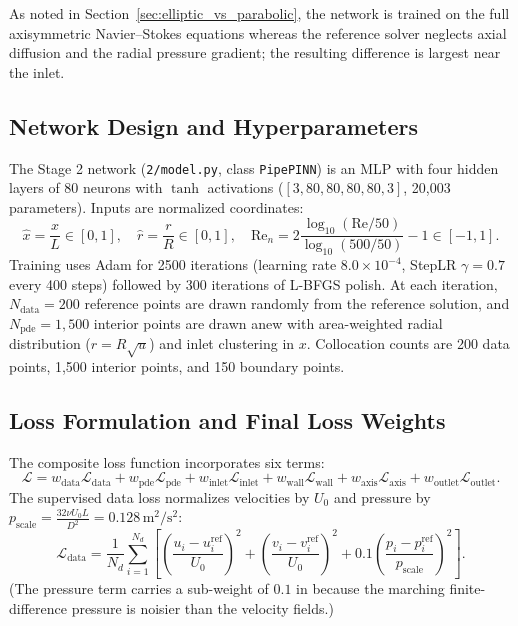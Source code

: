 \documentclass[11pt,a4paper]{article}
\begin{document}
As noted in Section~\ref{sec:elliptic_vs_parabolic}, the network is trained on the full axisymmetric Navier--Stokes equations whereas the reference solver neglects axial diffusion and the radial pressure gradient; the resulting difference is largest near the inlet.

\subsection{Network Design and Hyperparameters}
The Stage 2 network (\texttt{2/model.py}, class \texttt{PipePINN}) is an MLP with four hidden layers of 80 neurons with $\tanh$ activations ($[3, 80, 80, 80, 80, 3]$, 20,003 parameters). Inputs are normalized coordinates:
\begin{equation}
\hat{x} = \frac{x}{L} \in [0, 1], \quad \hat{r} = \frac{r}{R} \in [0, 1], \quad \mathrm{Re}_n = 2\frac{\log_{10}(\mathrm{Re}/50)}{\log_{10}(500/50)} - 1 \in [-1, 1].
\end{equation}
Training uses Adam for 2500 iterations (learning rate $8.0\times 10^{-4}$, StepLR $\gamma=0.7$ every 400 steps) followed by 300 iterations of L-BFGS polish. At each iteration, $N_{\mathrm{data}} = 200$ reference points are drawn randomly from the reference solution, and $N_{\mathrm{pde}} = 1{,}500$ interior points are drawn anew with area-weighted radial distribution ($r = R\sqrt{u}$) and inlet clustering in $x$. Collocation counts are 200 data points, 1,500 interior points, and 150 boundary points.

\subsection{Loss Formulation and Final Loss Weights}
The composite loss function incorporates six terms:
\begin{equation}
\mathcal{L} = w_{\mathrm{data}}\mathcal{L}_{\mathrm{data}} + w_{\mathrm{pde}}\mathcal{L}_{\mathrm{pde}} + w_{\mathrm{inlet}}\mathcal{L}_{\mathrm{inlet}} + w_{\mathrm{wall}}\mathcal{L}_{\mathrm{wall}} + w_{\mathrm{axis}}\mathcal{L}_{\mathrm{axis}} + w_{\mathrm{outlet}}\mathcal{L}_{\mathrm{outlet}}.
\end{equation}
The supervised data loss normalizes velocities by $U_0$ and pressure by $p_{\mathrm{scale}} = \frac{32\nu U_0 L}{D^2} = 0.128\,\text{m}^2/\text{s}^2$:
\begin{equation}
\mathcal{L}_{\mathrm{data}} = \frac{1}{N_d}\sum_{i=1}^{N_d} \left[ \left(\frac{u_i - u_i^{\mathrm{ref}}}{U_0}\right)^2 + \left(\frac{v_i - v_i^{\mathrm{ref}}}{U_0}\right)^2 + 0.1\left(\frac{p_i - p_i^{\mathrm{ref}}}{p_{\mathrm{scale}}}\right)^2 \right].
\end{equation}
(The pressure term carries a sub-weight of $0.1$ in  because the marching finite-difference pressure is noisier than the velocity fields.)
\end{document}
